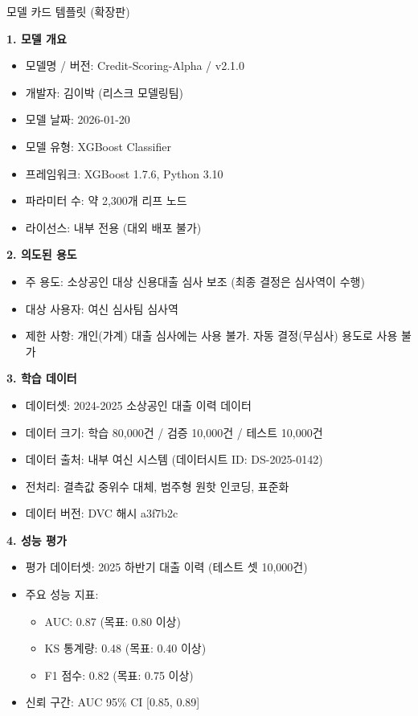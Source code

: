 \begin{practicaltool}{모델 카드 템플릿 (확장판)}
\begin{tcolorbox}[colback=white, colframe=black!75!white, title=Model Card for {[모델명]}]

\textbf{1. 모델 개요}
\begin{itemize}
  \item 모델명 / 버전: Credit-Scoring-Alpha / v2.1.0
  \item 개발자: 김이박 (리스크 모델링팀)
  \item 모델 날짜: 2026-01-20
  \item 모델 유형: XGBoost Classifier
  \item 프레임워크: XGBoost 1.7.6, Python 3.10
  \item 파라미터 수: 약 2,300개 리프 노드
  \item 라이선스: 내부 전용 (대외 배포 불가)
\end{itemize}

\textbf{2. 의도된 용도}
\begin{itemize}
  \item 주 용도: 소상공인 대상 신용대출 심사 보조 (최종 결정은 심사역이 수행)
  \item 대상 사용자: 여신 심사팀 심사역
  \item 제한 사항: 개인(가계) 대출 심사에는 사용 불가. 자동 결정(무심사) 용도로 사용 불가
\end{itemize}

\textbf{3. 학습 데이터}
\begin{itemize}
  \item 데이터셋: 2024-2025 소상공인 대출 이력 데이터
  \item 데이터 크기: 학습 80,000건 / 검증 10,000건 / 테스트 10,000건
  \item 데이터 출처: 내부 여신 시스템 (데이터시트 ID: DS-2025-0142)
  \item 전처리: 결측값 중위수 대체, 범주형 원핫 인코딩, 표준화
  \item 데이터 버전: DVC 해시 a3f7b2c
\end{itemize}

\textbf{4. 성능 평가}
\begin{itemize}
  \item 평가 데이터셋: 2025 하반기 대출 이력 (테스트 셋 10,000건)
  \item 주요 성능 지표:
  \begin{itemize}
    \item AUC: 0.87 (목표: 0.80 이상)
    \item KS 통계량: 0.48 (목표: 0.40 이상)
    \item F1 점수: 0.82 (목표: 0.75 이상)
  \end{itemize}
  \item 신뢰 구간: AUC 95\% CI [0.85, 0.89]
\end{itemize}


\end{tcolorbox}
\end{practicaltool}
